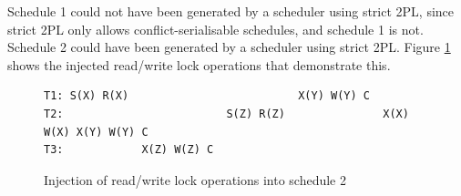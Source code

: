 Schedule 1 could not have been generated by a scheduler using strict 2PL, since strict 2PL only allows conflict-serialisable schedules, and schedule 1 is not.
Schedule 2 could have been generated by a scheduler using strict 2PL. Figure \ref{schedule2strict2pl} shows the injected read/write lock operations that demonstrate this.

\begin{figure}
\begin{verbatim}
T1: S(X) R(X)                          X(Y) W(Y) C
T2:                         S(Z) R(Z)               X(X) W(X) X(Y) W(Y) C
T3:            X(Z) W(Z) C
\end{verbatim}
\caption{Injection of read/write lock operations into schedule 2\label{schedule2strict2pl}}
\end{figure}
